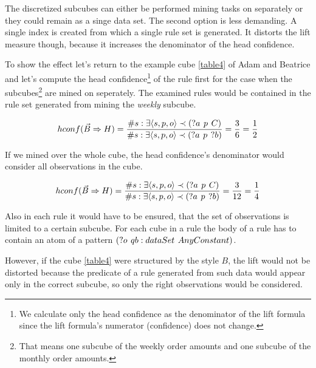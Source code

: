 The discretized subcubes can either be performed mining tasks on separately or they could remain as a singe data set. The second option is less demanding. A single index is created from which a single rule set is generated. It distorts the lift measure though, because it increases the denominator of the head confidence.

To show the effect let's return to the example cube \ref{table4} of Adam and Beatrice and let's compute the head confidence\footnote{We calculate only the head confidence as the denominator of the lift formula since the lift formula's numerator (confidence) does not change.} of the rule first for the case when the subcubes\footnote{That means one subcube of the weekly order amounts and one subcube of the monthly order amounts.} are mined on seperately. The examined rules would be contained in the rule set generated from mining the \textit{weekly} subcube.

$$hconf(\vec{B} \Rightarrow H) = \frac{\# s: \exists \langle s,p,o\rangle \prec (?a\hspace{0.4em}p\hspace{0.4em}C) }{\# s: \exists \langle s,p,o\rangle \prec (?a\hspace{0.4em}p\hspace{0.4em}?b)} = \frac{3}{6} = \frac{1}{2}$$

If we mined over the whole cube, the head confidence's denominator would consider all observations in the cube.

$$hconf(\vec{B} \Rightarrow H) = \frac{\# s: \exists \langle s,p,o\rangle \prec (?a\hspace{0.4em}p\hspace{0.4em}C) }{\# s: \exists \langle s,p,o\rangle \prec (?a\hspace{0.4em}p\hspace{0.4em}?b)} = \frac{3}{12} = \frac{1}{4}$$

Also in each rule it would have to be ensured, that the set of observations is limited to a certain subcube. For each cube in a rule the body of a rule has to contain an atom of a pattern $(?o\hspace{0.4em}qb:dataSet\hspace{0.4em}AnyConstant)$.

However, if the cube \ref{table4} were structured by the style $B$, the lift would not be distorted because the predicate of a rule generated from such data would appear only in the correct subcube, so only the right observations would be considered.

